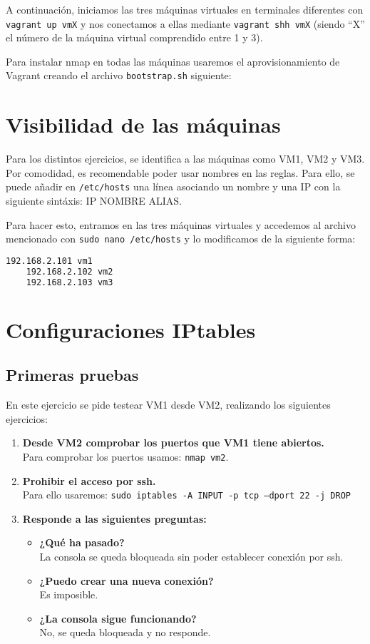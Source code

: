 \documentclass[12pt,letterpaper]{article}
\begin{document}
A continuación, iniciamos las tres máquinas virtuales en terminales diferentes con \texttt{vagrant up vmX} y nos conectamos a ellas mediante \texttt{vagrant shh vmX} (siendo ``X'' el número de la máquina virtual comprendido entre 1 y 3).

Para instalar nmap en todas las máquinas usaremos el aprovisionamiento de Vagrant creando el archivo \texttt{bootstrap.sh} siguiente:


\section{Visibilidad de las máquinas}
Para los distintos ejercicios, se identifica a las máquinas como VM1, VM2 y VM3. Por comodidad, es recomendable poder usar nombres en las reglas. Para ello, se puede añadir en \texttt{/etc/hosts} una línea asociando un nombre y una IP con la siguiente sintáxis: IP NOMBRE ALIAS.

Para hacer esto, entramos en las tres máquinas virtuales y accedemos al archivo mencionado con \texttt{sudo nano /etc/hosts} y lo modificamos de la siguiente forma:
\begin{lstlisting}[language=Bash]
	192.168.2.101 vm1
	192.168.2.102 vm2
	192.168.2.103 vm3
\end{lstlisting}

\section{Configuraciones IPtables}
\subsection{Primeras pruebas}
En este ejercicio se pide testear VM1 desde VM2, realizando los siguientes ejercicios:
\begin{enumerate}
	\item \textbf{Desde VM2 comprobar los puertos que VM1 tiene abiertos.} \\
	Para comprobar los puertos usamos: \texttt{nmap vm2}.
	\item \textbf{Prohibir el acceso por ssh.} \\
	Para ello usaremos: \texttt{sudo iptables -A INPUT -p tcp --dport 22 -j DROP}
	\item \textbf{Responde a las siguientes preguntas:}
	\begin{itemize}
		\item \textbf{¿Qué ha pasado?} \\
		La consola se queda bloqueada sin poder establecer conexión por ssh.
		\item \textbf{¿Puedo crear una nueva conexión?} \\
		Es imposible.
		\item \textbf{¿La consola sigue funcionando?} \\
		No, se queda bloqueada y no responde.
	\end{itemize}
\end{enumerate}
\end{document}
